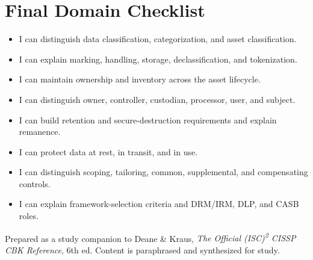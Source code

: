 \documentclass[10pt,letterpaper]{article}
\begin{document}
\section{\color{navy}Final Domain Checklist}
{\small
\begin{itemize}[label=\(\square\),nosep]
\item I can distinguish data classification, categorization, and asset classification.
\item I can explain marking, handling, storage, declassification, and tokenization.
\item I can maintain ownership and inventory across the asset lifecycle.
\item I can distinguish owner, controller, custodian, processor, user, and subject.
\item I can build retention and secure-destruction requirements and explain remanence.
\item I can protect data at rest, in transit, and in use.
\item I can distinguish scoping, tailoring, common, supplemental, and compensating controls.
\item I can explain framework-selection criteria and DRM/IRM, DLP, and CASB roles.
\end{itemize}
}
\vfill
{\footnotesize\color{teal}Prepared as a study companion to Deane \& Kraus, \textit{The Official (ISC)\textsuperscript{2} CISSP CBK Reference}, 6th ed. Content is paraphrased and synthesized for study.}
\end{document}
